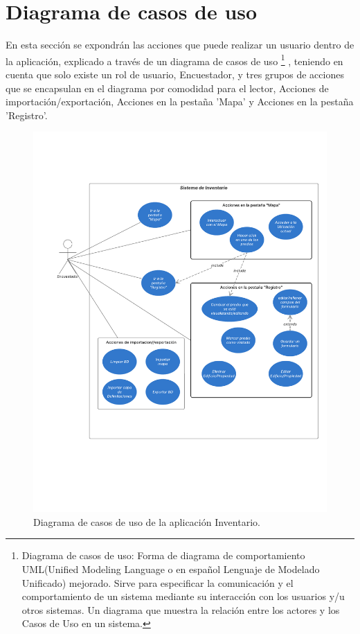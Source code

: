\section{Diagrama de casos de uso}
En esta sección se expondrán las acciones que puede realizar un usuario dentro de la aplicación, explicado a través de un diagrama de casos de uso
\footnote{Diagrama de casos de uso: Forma de diagrama de comportamiento UML(Unified Modeling Language o en español Lenguaje de Modelado Unificado) mejorado. Sirve para
    especificar la comunicación y el comportamiento de un sistema mediante su interacción con los usuarios
    y/u otros sistemas. Un diagrama que muestra la relación entre los actores y los Casos de Uso en un
    sistema.}
, teniendo en cuenta que solo existe un rol de usuario, Encuestador,
y tres grupos de acciones que se encapsulan en el diagrama por comodidad para el lector, Acciones de importación/exportación, Acciones en la pestaña 'Mapa' y Acciones en
la pestaña 'Registro'.
\pagebreak
\begin{figure}[h]
    \centering
    \includegraphics[scale=0.5]{Graphics/Capitulo 3/Diagrama_casos_de_uso.png}
    \caption{Diagrama de casos de uso de la aplicación Inventario.} %
    \label{fig:figura13}
\end{figure}
